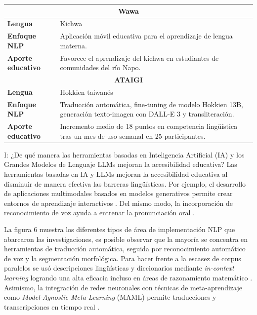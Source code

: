 \begin{table}[H]
\centering
{}
\small
    \begin{tabular}{p{2.2cm}p{4.8cm}}
    \toprule
    \multicolumn{2}{c}{\textbf{Wawa}} \\
    \midrule
    \textbf{Lengua} & Kichwa \\ \addlinespace
    \textbf{Enfoque NLP} & Aplicación móvil educativa para el aprendizaje de lengua materna. \\ \addlinespace
    \textbf{Aporte educativo} & Favorece el aprendizaje del kichwa en estudiantes de comunidades del río Napo. \\
    \midrule
    \multicolumn{2}{c}{\textbf{ATAIGI}} \\
    \midrule
    \textbf{Lengua} & Hokkien taiwanés \\ \addlinespace
    \textbf{Enfoque NLP} & Traducción automática, fine-tuning de modelo Hokkien 13B, generación texto-imagen con DALL-E 3 y transliteración. \\ \addlinespace
    \textbf{Aporte educativo} & Incremento medio de 18 puntos en competencia lingüística tras un mes de uso semanal en 25 participantes. \\
    \bottomrule
    \end{tabular}
\label{tab:nlp_lengua_materna_educacion}
\end{table}


I: ¿De qué manera las herramientas basadas en Inteligencia Artificial (IA) y los Grandes Modelos de Lenguaje LLMs mejoran la accesibilidad educativa?
Las herramientas basadas en IA y  LLMs mejoran la accesibilidad educativa al disminuir de manera efectiva las barreras lingüísticas. Por ejemplo, el desarrollo de aplicaciones multimodales basados en modelos generativos permite crear entornos de aprendizaje interactivos \cite{Chu2025}. Del mismo modo, la incorporación de reconocimiento de voz ayuda a entrenar la pronunciación oral \cite{Akallouch2025}.

La figura 6 muestra los diferentes tipos de área de implementación NLP que abarcaron las investigaciones, es posible observar que la mayoría se concentra en herramientas de traducción automática, seguida por reconocimiento automático de voz y la segmentación morfológica. Para hacer frente a la escasez de corpus paralelos se usó descripciones lingüísticas y diccionarios mediante \textit{in-context learning} logrando una alta eficacia incluso en áreas de razonamiento matemático \cite{Zhang2024}. Asimismo, la integración de redes neuronales con técnicas de meta-aprendizaje como \textit{Model-Agnostic Meta-Learning} (MAML) permite traducciones y transcripciones en tiempo real \cite{Fakhreldin2025}. 


